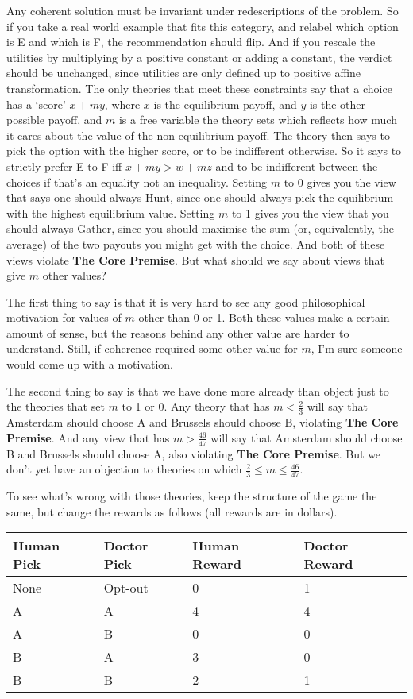 \documentclass[
  12pt,
]{article}
\begin{document}
Any coherent solution must be invariant under redescriptions of the
problem. So if you take a real world example that fits this category,
and relabel which option is E and which is F, the recommendation should
flip. And if you rescale the utilities by multiplying by a positive
constant or adding a constant, the verdict should be unchanged, since
utilities are only defined up to positive affine transformation. The
only theories that meet these constraints say that a choice has a
`score' \(x + my\), where \(x\) is the equilibrium payoff, and \(y\) is
the other possible payoff, and \(m\) is a free variable the theory sets
which reflects how much it cares about the value of the non-equilibrium
payoff. The theory then says to pick the option with the higher score,
or to be indifferent otherwise. So it says to strictly prefer E to F iff
\(x + my > w + mz\) and to be indifferent between the choices if that's
an equality not an inequality. Setting \(m\) to 0 gives you the view
that says one should always Hunt, since one should always pick the
equilibrium with the highest equilibrium value. Setting \(m\) to 1 gives
you the view that you should always Gather, since you should maximise
the sum (or, equivalently, the average) of the two payouts you might get
with the choice. And both of these views violate \textbf{The Core
Premise}. But what should we say about views that give \(m\) other
values?

The first thing to say is that it is very hard to see any good
philosophical motivation for values of \(m\) other than 0 or 1. Both
these values make a certain amount of sense, but the reasons behind any
other value are harder to understand. Still, if coherence required some
other value for \(m\), I'm sure someone would come up with a motivation.

The second thing to say is that we have done more already than object
just to the theories that set \(m\) to 1 or 0. Any theory that has
\(m < \frac{2}{3}\) will say that Amsterdam should choose A and Brussels
should choose B, violating \textbf{The Core Premise}. And any view that
has \(m > \frac{46}{47}\) will say that Amsterdam should choose B and
Brussels should choose A, also violating \textbf{The Core Premise}. But
we don't yet have an objection to theories on which
\(\frac{2}{3} \leq m \leq \frac{46}{47}\).

To see what's wrong with those theories, keep the structure of the game
the same, but change the rewards as follows (all rewards are in
dollars).

\begin{longtable}[]{@{}llll@{}}
\toprule
Human Pick & Doctor Pick & Human Reward & Doctor Reward \\
\midrule
\endhead
None & Opt-out & 0 & 1 \\
A & A & 4 & 4 \\
A & B & 0 & 0 \\
B & A & 3 & 0 \\
B & B & 2 & 1 \\
\bottomrule
\end{longtable}
\end{document}

